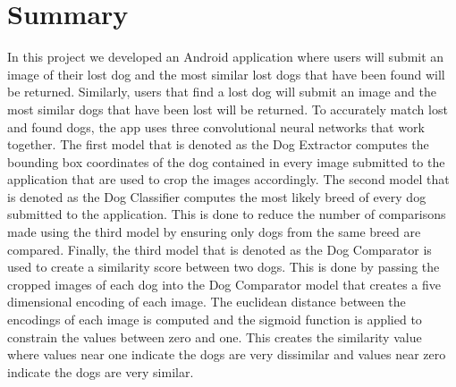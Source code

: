 \documentclass{article}
\begin{document}


\section{Summary}
	In this project we developed an Android application where users will submit an image of their lost dog and the most similar lost dogs that have been found will be returned.  Similarly, users that find a lost dog will submit an image and the most similar dogs that have been lost will be returned.  To accurately match lost and found dogs, the app uses three convolutional neural networks that work together.  The first model that is denoted as the Dog Extractor computes the bounding box coordinates of the dog contained in every image submitted to the application that are used to crop the images accordingly.  The second model that is denoted as the Dog Classifier computes the most likely breed of every dog submitted to the application.  This is done to reduce the number of comparisons made using the third model by ensuring only dogs from the same breed are compared.  Finally, the third model that is denoted as the Dog Comparator is used to create a similarity score between two dogs.  This is done by passing the cropped images of each dog into the Dog Comparator model that creates a five dimensional encoding of each image.  The euclidean distance between the encodings of each image is computed and the sigmoid function is applied to constrain the values between zero and one.  This creates the similarity value where values near one indicate the dogs are very dissimilar and values near zero indicate the dogs are very similar.
\end{document}
